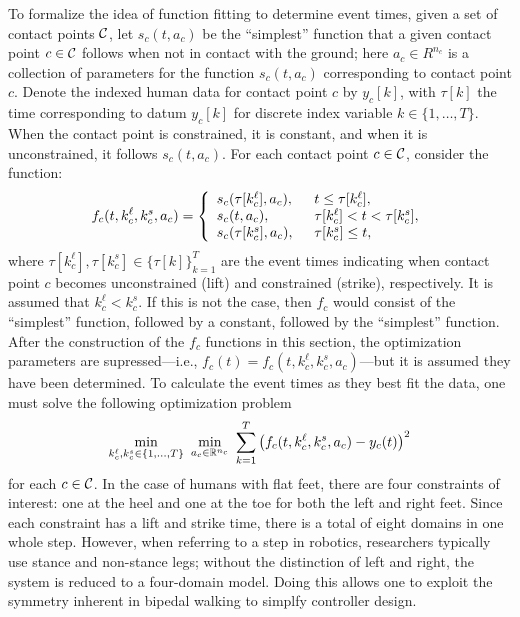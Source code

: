 To formalize the idea of function fitting to determine event times, given a set
of contact points $\mathcal{C}$, let $s_{c}(t, a_{c})$ be the ``simplest'' function that
a given contact point $c \in \mathcal{C}$ follows when not in contact with the ground;
%
here $a_{c} \in R^{n_{c}}$ is a collection of parameters for the function
$s_{c}(t, a_{c})$ corresponding to contact point $c$.
%
Denote the indexed human data for contact point $c$ by $y_{c}[k]$, with
$\tau[k]$ the time corresponding to datum $y_{c}[k]$ for discrete index variable
$k \in \{1,\ldots,T\}$.
%
When the contact point is constrained, it is constant, and when it is
unconstrained, it follows $s_{c}(t, a_{c})$.
%
For each contact point $c \in \mathcal{C}$, consider the function:
%
\begin{align*}
  f_{c}(t, k_{c}^{\ell}, k_{c}^{s}, a_{c}) =  \left\{\begin{array}{l l}
      s_{c}(\tau[k_{c}^{\ell}], a_{c}), & \hspace{2mm} t \leq
      \tau[k_{c}^{\ell}],\\
      s_{c}(t, a_{c}), & \hspace{2mm} \tau[k_{c}^{\ell}] < t <
      \tau[k_{c}^{s}],\\
      s_{c}(\tau[k_{c}^{s}], a_{c}), & \hspace{2mm} \tau[k_{c}^{s}] \leq t,\\
  \end{array} \right.
\end{align*}
where $\tau[k_{c}^{\ell}], \tau[k_{c}^{s}] \in \{\tau[k]\}_{k = 1}^{T}$ are the
event times indicating when contact point $c$ becomes unconstrained (lift) and
constrained (strike), respectively.
%
It is assumed that $k_{c}^{\ell} < k_{c}^{s}$.
%
If this is not the case, then $f_{c}$ would consist of the ``simplest''
function, followed by a constant, followed by the ``simplest'' function.
%
After the construction of the $f_{c}$ functions in this section, the
optimization parameters are supressed---i.e., $f_{c}(t) = f_{c}(t, k_{c}^{\ell},
k_{c}^{s}, a_{c})$---but it is assumed they have been determined.
%
To calculate the event times as they best fit the data, one must solve the
following optimization problem
\begin{align*}
  \min_{k_{c}^{\ell}, k_{c}^{s} \in \{1, \ldots, T\}} \ \min_{a_{c} \in
    \mathbb{R}^{n_{c}}} \ \sum_{k = 1}^{T} \left( f_{c}(t, k_{c}^{\ell}, k_{c}^{s},
    a_{c}) - y_{c}(t) \right)^2
\end{align*}
for each $c \in \mathcal{C}$.
%
In the case of humans with flat feet, there are four constraints of interest:
%
one at the heel and one at the toe for both the left and right feet.
%
Since each constraint has a lift and strike time, there is a total of eight
domains in one whole step.
%
However, when referring to a step in robotics, researchers typically use stance
and non-stance legs;
%
without the distinction of left and right, the system is reduced to a
four-domain model.
%
Doing this allows one to exploit the symmetry inherent in bipedal walking to
simplfy controller design.

